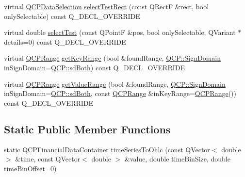 \begin{DoxyCompactItemize}
\item 
virtual \hyperlink{class_q_c_p_data_selection}{Q\+C\+P\+Data\+Selection} \hyperlink{class_q_c_p_financial_a3c5beb1ab028a1dba845fc9dcffc7cf4}{select\+Test\+Rect} (const Q\+RectF \&rect, bool only\+Selectable) const Q\+\_\+\+D\+E\+C\+L\+\_\+\+O\+V\+E\+R\+R\+I\+DE
\item 
virtual double \hyperlink{class_q_c_p_financial_aac8e91622ac58330fa9ce81cc8fd40ee}{select\+Test} (const Q\+PointF \&pos, bool only\+Selectable, Q\+Variant $\ast$details=0) const Q\+\_\+\+D\+E\+C\+L\+\_\+\+O\+V\+E\+R\+R\+I\+DE
\item 
virtual \hyperlink{class_q_c_p_range}{Q\+C\+P\+Range} \hyperlink{class_q_c_p_financial_a15d68fb257113fef697356d65fa76559}{get\+Key\+Range} (bool \&found\+Range, \hyperlink{namespace_q_c_p_afd50e7cf431af385614987d8553ff8a9}{Q\+C\+P\+::\+Sign\+Domain} in\+Sign\+Domain=\hyperlink{namespace_q_c_p_afd50e7cf431af385614987d8553ff8a9aa38352ef02d51ddfa4399d9551566e24}{Q\+C\+P\+::sd\+Both}) const Q\+\_\+\+D\+E\+C\+L\+\_\+\+O\+V\+E\+R\+R\+I\+DE
\item 
virtual \hyperlink{class_q_c_p_range}{Q\+C\+P\+Range} \hyperlink{class_q_c_p_financial_a82d862aa134d78853f98f8c57a03415b}{get\+Value\+Range} (bool \&found\+Range, \hyperlink{namespace_q_c_p_afd50e7cf431af385614987d8553ff8a9}{Q\+C\+P\+::\+Sign\+Domain} in\+Sign\+Domain=\hyperlink{namespace_q_c_p_afd50e7cf431af385614987d8553ff8a9aa38352ef02d51ddfa4399d9551566e24}{Q\+C\+P\+::sd\+Both}, const \hyperlink{class_q_c_p_range}{Q\+C\+P\+Range} \&in\+Key\+Range=\hyperlink{class_q_c_p_range}{Q\+C\+P\+Range}()) const Q\+\_\+\+D\+E\+C\+L\+\_\+\+O\+V\+E\+R\+R\+I\+DE
\end{DoxyCompactItemize}
\subsection*{Static Public Member Functions}
\begin{DoxyCompactItemize}
\item 
static \hyperlink{class_q_c_p_data_container}{Q\+C\+P\+Financial\+Data\+Container} \hyperlink{class_q_c_p_financial_a9a058c035040d3939b8884f4aaccb1a7}{time\+Series\+To\+Ohlc} (const Q\+Vector$<$ double $>$ \&time, const Q\+Vector$<$ double $>$ \&value, double time\+Bin\+Size, double time\+Bin\+Offset=0)
\end{DoxyCompactItemize}
